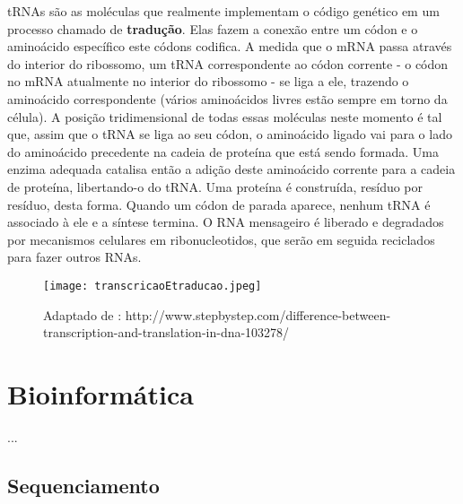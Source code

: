 \indent tRNAs são as moléculas que realmente implementam o código genético em um processo chamado de \textbf{tradução}. Elas fazem a conexão entre um códon e o aminoácido específico este códons codifica. A medida que o mRNA passa através do interior do ribossomo, um tRNA correspondente ao códon corrente - o códon no mRNA atualmente no interior do ribossomo - se liga a ele, trazendo o aminoácido correspondente (vários aminoácidos livres estão sempre em torno da célula). A posição tridimensional de todas essas moléculas neste momento é tal que, assim que o tRNA se liga ao seu códon, o aminoácido ligado vai para o lado do aminoácido precedente na cadeia de proteína que está sendo formada. Uma enzima adequada catalisa então a adição deste aminoácido corrente para a cadeia de proteína, libertando-o do tRNA. Uma proteína é construída, resíduo por resíduo, desta forma. Quando um códon de parada aparece, nenhum tRNA é associado à ele e a síntese termina. O RNA mensageiro é liberado e degradados por mecanismos celulares em ribonucleotidos, que serão em seguida reciclados para fazer outros RNAs. \\




\cite{setubal97}






\begin{figure}[h]
    \centering
    \texttt{[image: transcricaoEtraducao.jpeg]}
    \caption{Adaptado de : http://www.stepbystep.com/difference-between-transcription-and-translation-in-dna-103278/ }
    \label{fig:transcricaoEtraducao}
\end{figure}




\section{Bioinformática} \label{bioinformatica}
 \indent ...
\subsection{Sequenciamento} 


